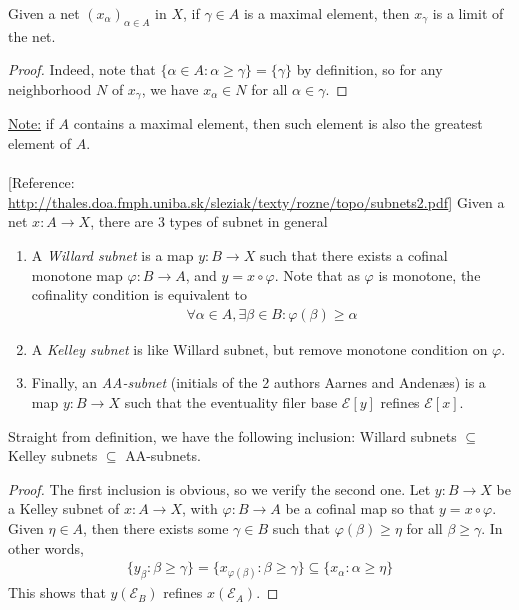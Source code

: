 \documentclass{treatise}
\begin{document}
\begin{remark}
Given a net $(x_\alpha)_{\alpha \in A}$ in $X$, if $\gamma \in A$ is a maximal element, then $x_\gamma$ is a limit of the net.
\end{remark}
\begin{proof}
Indeed, note that $\{ \alpha \in A : \alpha \geq \gamma \} = \{ \gamma \}$ by definition, so for any neighborhood $N$ of $x_\gamma$, we have $x_\alpha \in N$ for all $\alpha \in \gamma$.
\end{proof}
\underline{Note:} if $A$ contains a maximal element, then such element is also the greatest element of $A$.
\\
\\
{[Reference: \url{http://thales.doa.fmph.uniba.sk/sleziak/texty/rozne/topo/subnets2.pdf}]} Given a net $x: A \to X$, there are 3 types of subnet in general
\begin{enumerate}
    \item A \emph{Willard subnet} is a map $y: B \to X$ such that there exists a cofinal monotone map $\varphi: B \to A$, and $y = x \circ \varphi$. Note that as $\varphi$ is monotone, the cofinality condition is equivalent to
    \begin{align*}
        \forall \alpha \in A, \exists \beta \in B: \varphi(\beta) \geq \alpha
    \end{align*}
    \item A \emph{Kelley subnet} is like Willard subnet, but remove monotone condition on $\varphi$.
    \item Finally, an \emph{AA-subnet} (initials of the 2 authors Aarnes and  Andenæs) is a map $y: B \to X$ such that the eventuality filer base $\mathcal{E}[y]$ refines $\mathcal{E}[x]$. 
\end{enumerate}
\begin{remark}
Straight from definition, we have the following inclusion: Willard subnets $\subseteq$ Kelley subnets $\subseteq$ AA-subnets.
\end{remark}
\begin{proof}
The first inclusion is obvious, so we verify the second one. Let $y: B \to X$ be a Kelley subnet of $x: A \to X$, with $\varphi: B \to A$ be a cofinal map so that $y = x \circ \varphi$. Given $\eta \in A$, then there exists some $\gamma \in B$ such that $\varphi(\beta) \geq \eta$ for all $\beta \geq \gamma$. In other words,
\begin{align*}
    \{ y_\beta : \beta \geq \gamma \} = \{ x_{\varphi(\beta)} : \beta \geq \gamma \} \subseteq \{ x_\alpha : \alpha \geq \eta \}
\end{align*}
This shows that $y(\mathcal{E}_B)$ refines $x(\mathcal{E}_A)$.
\end{proof}
\end{document}
